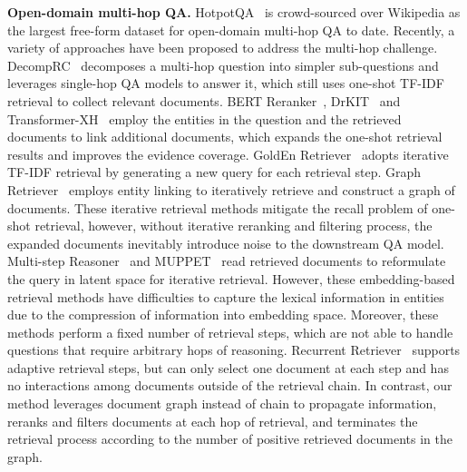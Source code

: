 \documentclass[sigconf]{acmart}
\begin{document}
\BlankLine
\noindent \textbf{Open-domain multi-hop QA.} HotpotQA~\cite{yang-etal-2018-hotpotqa} is crowd-sourced over Wikipedia as the largest free-form dataset for open-domain multi-hop QA to date. Recently, a variety of approaches have been proposed to address the multi-hop challenge.
DecompRC~\cite{min-etal-2019-multi} decomposes a multi-hop question into simpler sub-questions and leverages single-hop QA models to answer it, which still uses one-shot TF-IDF retrieval to collect relevant documents. BERT Reranker~\cite{das-etal-2019-multi}, DrKIT~\cite{Dhingra2020Differentiable} and Transformer-XH~\cite{zhaotransxh2020} employ the entities in the question and the retrieved documents to link additional documents, which expands the one-shot retrieval results and improves the evidence coverage. GoldEn Retriever~\cite{qi-etal-2019-answering} adopts iterative TF-IDF retrieval by generating a new query for each retrieval step. Graph Retriever~\cite{min2019knowledge} employs entity linking to iteratively retrieve and construct a graph of documents. These iterative retrieval methods mitigate the recall problem of one-shot retrieval, however, without iterative reranking and filtering process, the expanded documents inevitably introduce noise to the downstream QA model. Multi-step Reasoner~\cite{das2018multistep} and MUPPET~\cite{feldman-el-yaniv-2019-multi} read retrieved documents to reformulate the query in latent space for iterative retrieval. However, these embedding-based retrieval methods have difficulties to capture the lexical information in entities due to the compression of information into embedding space. Moreover, these methods perform a fixed number of retrieval steps, which are not able to handle questions that require arbitrary hops of reasoning. Recurrent Retriever~\cite{asai2020learning} supports adaptive retrieval steps, but can only select one document at each step and has no interactions among documents outside of the retrieval chain. In contrast, our method leverages document graph instead of chain to propagate information, reranks and filters documents at each hop of retrieval, and terminates the retrieval process according to the number of positive retrieved documents in the graph.
\end{document}
